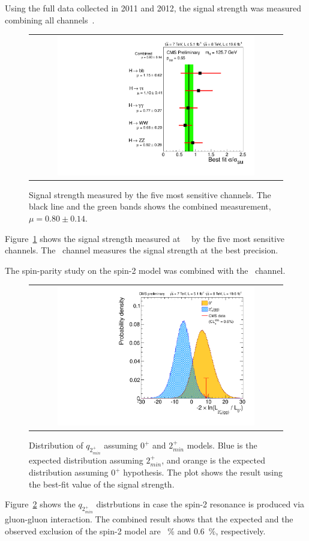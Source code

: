 Using the full data collected in 2011 and 2012, the signal strength 
was measured combining all channels~\cite{CMS-PAS-HIG-13-005}. 
\begin{figure}[htp] \centering 
\begin{tabular}{c} 
\includegraphics[width=0.8\textwidth]{figures/sqr_mlz_ccc_mH125_7_decay.pdf} 
\end{tabular} 
\caption{Signal strength measured by the five most sensitive channels. 
The black line and the green bands shows the combined measurement, 
$\mu = 0.80 \pm 0.14$.} 
\label{fig:mucomb} 
\end{figure} 
Figure~\ref{fig:mucomb} shows the signal strength measured at ~\GeV\
by the five most sensitive channels. The \hww\ channel measures the signal strength
at the best precision. 

The spin-parity study on the spin-2 model was combined with the \hzz\ channel.  
\begin{figure}[htp] \centering 
\begin{tabular}{c} 
\includegraphics[width=0.8\textwidth]{figures/hvv_a-posteriori_qvals_root_2pmgg.pdf} 
\end{tabular} 
\caption{Distribution of $q_{2_{min}^+}$ assuming $0^+$ and $2_{min}^+$ models.  
Blue is the expected distribution assuming $2_{min}^+$, 
and orange is the expected distribution assuming $0^+$ hypothesis.
The plot shows the result using the best-fit value of the signal strength.}  
\label{fig:spincomb} 
\end{figure} 
Figure~\ref{fig:spincomb} shows the $q_{2_{min}^+}$ distrbutions in case the spin-2 resonance 
is produced via gluon-gluon interaction. The combined result shows that the 
expected and the observed exclusion of the spin-2 model are \CLs=1.2~\% and 0.6~\%, 
respectively. 
\\ 

